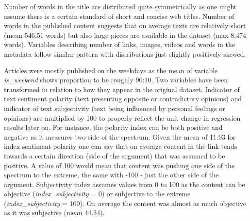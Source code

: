 \documentclass{article}
\begin{document}
Number of words in the title are distributed quite symmetrically as one might assume there is a certain standard of short and concise web titles. Number of words in the published content suggests that on average texts are relatively short (mean 546.51 words) but also large pieces are available in the dataset (max 8,474 words). Variables describing number of links, images, videos and words in the metadata follow similar pattern with distributions just slightly positively skewed. 

Articles were mostly published on the weekdays as the mean of variable \textit{is\_weekend} shows proportion to be roughly 90:10. Two variables have been transformed in relation to how they appear in the original dataset. Indicator of text sentiment polarity (text presenting opposite or contradictory opinions) and indicator of text subjectivity (text being influenced by personal feelings or opinions) are multiplied by 100 to properly reflect the unit change in regression results later on. For instance, the polarity index can be both positive and negative as it measures two side of the spectrum. Given the mean of 11.93 for index sentiment polarity one can say that on average content in the link tends towards a certain direction (side of the argument) that was assumed to be positive. A value of 100 would mean that content was pushing one side of the spectrum to the extreme, the same with -100 - just the other side of the argument. Subjectivity index assumes values from 0 to 100 as the content can be objective (\textit{index\_subjectivity} = 0) or subjective to the extreme (\textit{index\_subjectivity} = 100). On average the content was almost as much objective as it was subjective (mean 44.34).
\end{document}
